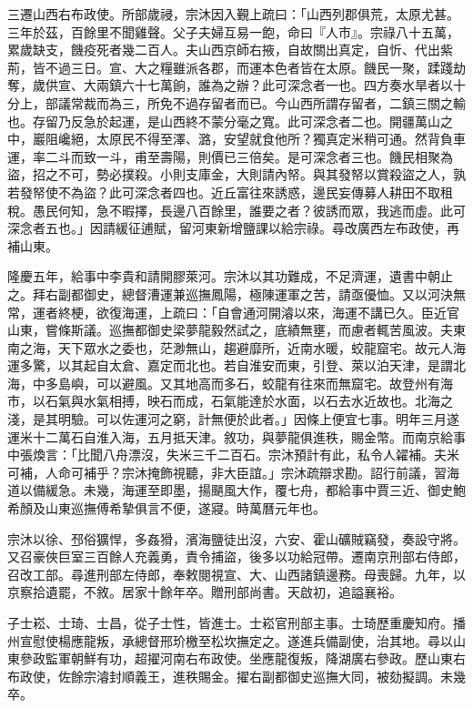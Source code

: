 \begin{pinyinscope}
{{三遷山西右布政使。所部歲祲，宗沐因入覲上疏曰：「山西列郡俱荒，太原尤甚。三年於茲，百餘里不聞雞聲。父子夫婦互易一飽，命曰『人市』。宗祿八十五萬，累歲缺支，饑疫死者幾二百人。夫山西京師右掖，自故關出真定，自忻、代出紫荊，皆不過三日。宣、大之糧雖派各郡，而運本色者皆在太原。饑民一聚，蹂踐劫奪，歲供宣、大兩鎮六十七萬餉，誰為之辦？此可深念者一也。四方奏水旱者以十分上，部議常裁而為三，所免不過存留者而已。今山西所謂存留者，二鎮三關之輸也。存留乃反急於起運，是山西終不蒙分毫之寬。此可深念者二也。開疆萬山之中，巖阻巉絕，太原民不得至澤、潞，安望就食他所？獨真定米稍可通。然背負車運，率二斗而致一斗，甫至壽陽，則價已三倍矣。是可深念者三也。饑民相聚為盜，招之不可，勢必撲殺。小則支庫金，大則請內帑。與其發帑以賞殺盜之人，孰若發帑使不為盜？此可深念者四也。近丘富往來誘惑，邊民妄傳募人耕田不取租稅。愚民何知，急不暇擇，長邊八百餘里，誰要之者？彼誘而眾，我逃而虛。此可深念者五也。」因請緩征逋賦，留河東新增鹽課以給宗祿。尋改廣西左布政使，再補山東。

隆慶五年，給事中李貴和請開膠萊河。宗沐以其功難成，不足濟運，遺書中朝止之。拜右副都御史，總督漕運兼巡撫鳳陽，極陳運軍之苦，請亟優恤。又以河決無常，運者終梗，欲復海運，上疏曰：「自會通河開濬以來，海運不講已久。臣近官山東，嘗條斯議。巡撫都御史梁夢龍毅然試之，底績無壅，而慮者輒苦風波。夫東南之海，天下眾水之委也，茫渺無山，趨避靡所，近南水暖，蛟龍窟宅。故元人海運多驚，以其起自太倉、嘉定而北也。若自淮安而東，引登、萊以泊天津，是謂北海，中多島嶼，可以避風。又其地高而多石，蛟龍有往來而無窟宅。故登州有海市，以石氣與水氣相搏，映石而成，石氣能達於水面，以石去水近故也。北海之淺，是其明驗。可以佐運河之窮，計無便於此者。」因條上便宜七事。明年三月遂運米十二萬石自淮入海，五月抵天津。敘功，與夢龍俱進秩，賜金幣。而南京給事中張煥言：「比聞八舟漂沒，失米三千二百石。宗沐預計有此，私令人糴補。夫米可補，人命可補乎？宗沐掩飾視聽，非大臣誼。」宗沐疏辯求勘。詔行前議，習海道以備緩急。未幾，海運至即墨，揚颶風大作，覆七舟，都給事中賈三近、御史鮑希顏及山東巡撫傅希摯俱言不便，遂寢。時萬曆元年也。

宗沐以徐、邳俗獷悍，多姦猾，濱海鹽徒出沒，六安、霍山礦賊竊發，奏設守將。又召豪俠巨室三百餘人充義勇，責令捕盜，後多以功給冠帶。遷南京刑部右侍郎，召改工部。尋進刑部左侍郎，奉敕閱視宣、大、山西諸鎮邊務。母喪歸。九年，以京察拾遺罷，不敘。居家十餘年卒。贈刑部尚書。天啟初，追謚襄裕。

子士崧、士琦、士昌，從子士性，皆進士。士崧官刑部主事。士琦歷重慶知府。播州宣慰使楊應龍叛，承總督邢玠檄至松坎撫定之。遂進兵備副使，治其地。尋以山東參政監軍朝鮮有功，超擢河南右布政使。坐應龍復叛，降湖廣右參政。歷山東右布政使，佐餘宗濬封順義王，進秩賜金。擢右副都御史巡撫大同，被劾擬調。未幾卒。

}}
\end{pinyinscope}
